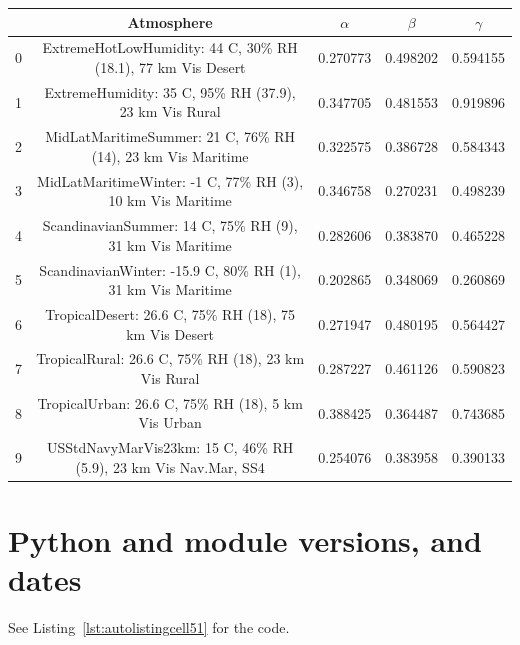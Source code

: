 \documentclass{workpackage}
\begin{document}
\begin{center}

\begin{footnotesize}

\begin{tabular}{|c|c|c|c|c|}
\hline
&Atmosphere&$\alpha$&$\beta$&$\gamma$\\\hline
0&ExtremeHotLowHumidity: 44 C, 30\% RH (18.1), 77 km Vis Desert&0.270773&0.498202&0.594155\\\hline
1&ExtremeHumidity: 35 C, 95\% RH (37.9), 23 km Vis Rural&0.347705&0.481553&0.919896\\\hline
2&MidLatMaritimeSummer: 21 C, 76\% RH (14), 23 km Vis Maritime&0.322575&0.386728&0.584343\\\hline
3&MidLatMaritimeWinter: -1 C, 77\% RH (3), 10 km Vis Maritime&0.346758&0.270231&0.498239\\\hline
4&ScandinavianSummer: 14 C, 75\% RH (9), 31 km Vis Maritime&0.282606&0.383870&0.465228\\\hline
5&ScandinavianWinter: -15.9 C, 80\% RH (1), 31 km Vis Maritime&0.202865&0.348069&0.260869\\\hline
6&TropicalDesert: 26.6 C, 75\% RH (18), 75 km Vis Desert&0.271947&0.480195&0.564427\\\hline
7&TropicalRural: 26.6 C, 75\% RH (18), 23 km Vis Rural&0.287227&0.461126&0.590823\\\hline
8&TropicalUrban: 26.6 C, 75\% RH (18), 5 km Vis Urban&0.388425&0.364487&0.743685\\\hline
9&USStdNavyMarVis23km: 15 C, 46\% RH (5.9), 23 km Vis Nav.Mar, SS4&0.254076&0.383958&0.390133\\\hline

\end{tabular}
\end{footnotesize}
\end{center}


\chapter{Python and module versions, and dates}
\label{sec:Pythonandmoduleversionsanddates}

See Listing~\ref{lst:autolistingcell51} for the code.
\end{document}
